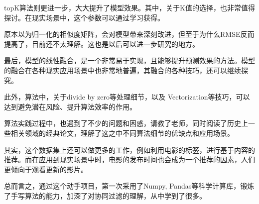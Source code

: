 \documentclass[utf8, a4paper, 11pt, onecolumn]{ctexart}
\begin{document}
\begin{spacing}{1.3}
topK算法则更进一步，大大提升了模型效果。其中，关于K值的选择，也非常值得探讨。在现实场景中，这个参数可以通过学习获得。

原本以为归一化的相似度矩阵，会对模型带来深刻改进，但至于为什么RMSE反而提高了，目前还不太理解。这也是以后可以进一步研究的地方。

最后，模型的线性融合，是一个非常易于实现，且能够提升预测效果的方法。模型的融合在各种现实应用场景中也非常地普遍，其融合的各种技巧，还可以继续探究。

此外，算法中，关于divide by zero等处理细节，以及 Vectorization等技巧，可以达到避免潜在风险、提升算法效率的作用。

算法实践过程中，也遇到了不少的问题和困惑，请教了老师，同时阅读了历史上一些相关领域的经典论文\cite{breese1998empirical}\cite{sarwar2001item}，理解了这之中不同算法细节的优缺点和应用场景。

其实，这个数据集上还可以做更多的工作，例如利用电影的标签，进行基于内容的推荐。而在应用到现实场景中时，电影的发布时间也会成为一个推荐的因素，人们更倾向于观看更新的影片。

总而言之，通过这个动手项目，第一次采用了Numpy, Pandas等科学计算库，锻炼了手写算法的能力，加深了对协同过滤的理解，从中学到了很多。





\end{spacing}
\end{document}
